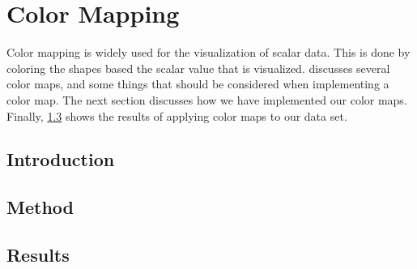 
\chapter{Color Mapping} %
\label{cha:color_mapping}

Color mapping is widely used for the visualization of scalar data. This is done by coloring the shapes based the scalar value that is visualized.  discusses several color maps, and some things that should be considered when implementing a color map. The next section discusses how we have implemented our color maps. Finally, \cref{s:colormapping:results} shows the results of applying color maps to our data set.  

\section{Introduction}
\label{s:colormapping:introduction}


\section{Method}
\label{s:colormapping:method}


\section{Results}
\label{s:colormapping:results}


